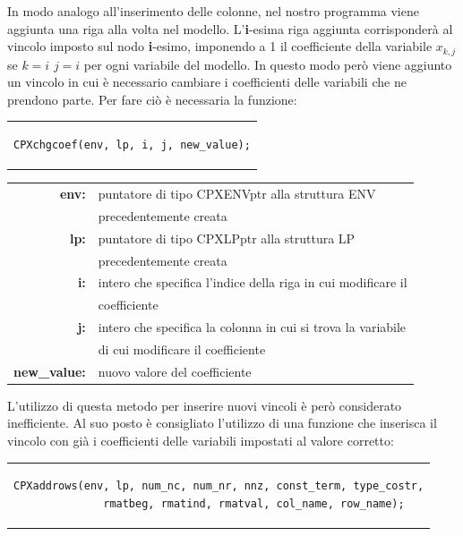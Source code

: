 In modo analogo all'inserimento delle colonne, nel nostro programma viene aggiunta una riga alla volta nel modello. L'\textbf{i}-esima riga aggiunta corrisponderà al vincolo imposto sul nodo \textbf{i}-esimo, imponendo a 1 il coefficiente della variabile $x_{k,j}$ se $k=i$ $j=i$ per ogni variabile del modello. In questo modo però viene aggiunto un vincolo in cui è necessario cambiare i coefficienti delle variabili che ne prendono parte. Per fare ciò è necessaria la funzione:
\begin{center}
\begin{tabular}{c}
\begin{lstlisting}[linewidth=230pt, basicstyle=\footnotesize\sffamily,]     
CPXchgcoef(env, lp, i, j, new_value);
\end{lstlisting}
\end{tabular}
\end{center}
\begin{table}[h]
\centering
\begin{tabular}{rl}
\textbf{env:} & {puntatore di tipo CPXENVptr alla struttura ENV}\\
& {precedentemente creata}\\
\textbf{lp:} & {puntatore di tipo CPXLPptr alla struttura LP}\\
& {precedentemente creata}\\
\textbf{i:} & {intero che specifica l'indice della riga in cui modificare il }\\
&{coefficiente}\\
\textbf{j:} & {intero che specifica la colonna in cui si trova la variabile}\\
&{di cui modificare il coefficiente}\\
\textbf{new\_value:} & {nuovo valore del coefficiente}\\
\end{tabular}
\end{table}
L'utilizzo di questa metodo per inserire nuovi vincoli è però considerato inefficiente. Al suo posto è consigliato l'utilizzo di una funzione che inserisca il vincolo con già i coefficienti delle variabili impostati al valore corretto:\\
\begin{center}
\begin{tabular}{c}
\begin{lstlisting}[linewidth=385pt, basicstyle=\footnotesize\sffamily,]     
CPXaddrows(env, lp, num_nc, num_nr, nnz, const_term, type_costr,
           rmatbeg, rmatind, rmatval, col_name, row_name);
\end{lstlisting}
\end{tabular}
\end{center}
